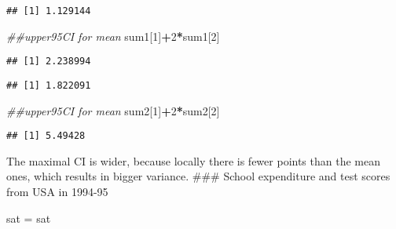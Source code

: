 \documentclass[]{article}
\newenvironment{Shaded}{\begin{snugshade}}{\end{snugshade}}
\newcommand{\CommentTok}[1]{\textcolor[rgb]{0.56,0.35,0.01}{\textit{#1}}}
\newcommand{\DecValTok}[1]{\textcolor[rgb]{0.00,0.00,0.81}{#1}}
\newcommand{\KeywordTok}[1]{\textcolor[rgb]{0.13,0.29,0.53}{\textbf{#1}}}
\newcommand{\NormalTok}[1]{#1}
\newcommand{\OperatorTok}[1]{\textcolor[rgb]{0.81,0.36,0.00}{\textbf{#1}}}
\newcommand{\StringTok}[1]{\textcolor[rgb]{0.31,0.60,0.02}{#1}}
\begin{document}
\begin{verbatim}
## [1] 1.129144
\end{verbatim}

\begin{Shaded}
\begin{Highlighting}[]
\CommentTok{##upper95CI for mean}
\NormalTok{sum1[}\DecValTok{1}\NormalTok{]}\OperatorTok{+}\DecValTok{2}\OperatorTok{*}\NormalTok{sum1[}\DecValTok{2}\NormalTok{]}
\end{Highlighting}
\end{Shaded}

\begin{verbatim}
## [1] 2.238994
\end{verbatim}

\begin{Shaded}
\end{Shaded}

\begin{verbatim}
## [1] 1.822091
\end{verbatim}

\begin{Shaded}
\begin{Highlighting}[]
\CommentTok{##upper95CI for mean}
\NormalTok{sum2[}\DecValTok{1}\NormalTok{]}\OperatorTok{+}\DecValTok{2}\OperatorTok{*}\NormalTok{sum2[}\DecValTok{2}\NormalTok{]}
\end{Highlighting}
\end{Shaded}

\begin{verbatim}
## [1] 5.49428
\end{verbatim}

The maximal CI is wider, because locally there is fewer points than the
mean ones, which results in bigger variance. \#\#\# School expenditure
and test scores from USA in 1994-95

\begin{Shaded}
\begin{Highlighting}[]
\NormalTok{sat =}\StringTok{ }\NormalTok{sat}
\end{Highlighting}
\end{Shaded}
\end{document}
